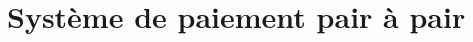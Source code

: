 \documentclass[letterpaper,twocolumn,10pt]{article}
\newcommand{\tronly}[2]{#1}
\theoremstyle{definition}
\begin{document}




\section{Système de paiement pair à pair}
\label{sec:implementation}

\end{document}
